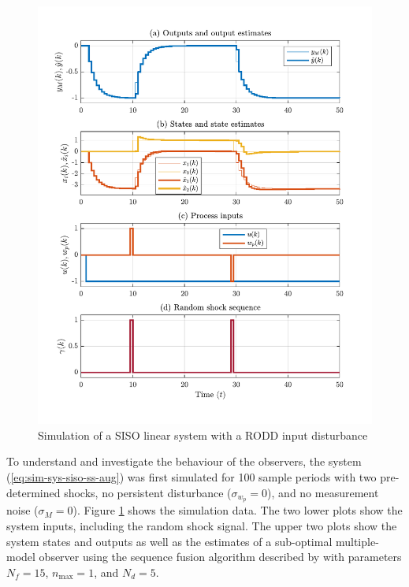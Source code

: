 \begin{figure}[htp]
	\centering
	\includegraphics[width=13cm]{images/rod_MKF_SF_test_sim_MKF_SF95_ioplot.pdf}
	\caption{Simulation of a SISO linear system with a \gls{RODD} input disturbance}
	\label{fig:rod-obs-sim-test-ioplot-SF95}
\end{figure}
To understand and investigate the behaviour of the observers, the system (\ref{eq:sim-sys-siso-ss-aug}) was first simulated for 100 sample periods with two pre-determined shocks, no persistent disturbance ($\sigma_{w_p}=0$), and no measurement noise ($\sigma_M=0$). Figure \ref{fig:rod-obs-sim-test-ioplot-SF95} shows the simulation data. The two lower plots show the system inputs, including the random shock signal. The upper two plots show the system states and outputs as well as the estimates of a sub-optimal multiple-model observer using the sequence fusion algorithm described by \cite{robertson_detection_1995} with parameters $N_f=15$, $n_\text{max}=1$, and $N_d=5$.

